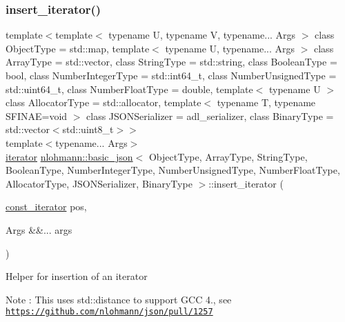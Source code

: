 \subsubsection{\texorpdfstring{insert\+\_\+iterator()}{insert\_iterator()}}
{\footnotesize\ttfamily template$<$template$<$ typename U, typename V, typename... Args $>$ class Object\+Type = std\+::map, template$<$ typename U, typename... Args $>$ class Array\+Type = std\+::vector, class String\+Type  = std\+::string, class Boolean\+Type  = bool, class Number\+Integer\+Type  = std\+::int64\+\_\+t, class Number\+Unsigned\+Type  = std\+::uint64\+\_\+t, class Number\+Float\+Type  = double, template$<$ typename U $>$ class Allocator\+Type = std\+::allocator, template$<$ typename T, typename S\+F\+I\+N\+A\+E=void $>$ class J\+S\+O\+N\+Serializer = adl\+\_\+serializer, class Binary\+Type  = std\+::vector$<$std\+::uint8\+\_\+t$>$$>$ \\
template$<$typename... Args$>$ \\
\hyperlink{classnlohmann_1_1basic__json_aa549b2b382916b3baafb526e5cb410bd}{iterator} \hyperlink{classnlohmann_1_1basic__json}{nlohmann\+::basic\+\_\+json}$<$ Object\+Type, Array\+Type, String\+Type, Boolean\+Type, Number\+Integer\+Type, Number\+Unsigned\+Type, Number\+Float\+Type, Allocator\+Type, J\+S\+O\+N\+Serializer, Binary\+Type $>$\+::insert\+\_\+iterator (\begin{DoxyParamCaption}\item[{\hyperlink{classnlohmann_1_1basic__json_aebd2cfa7e4ded4e97cde9269bfeeea38}{const\+\_\+iterator}}]{pos,  }\item[{Args \&\&...}]{args }\end{DoxyParamCaption})\hspace{0.3cm}{\ttfamily [inline]}}

Helper for insertion of an iterator \begin{DoxyNote}{Note}
\+: This uses std\+::distance to support G\+CC 4., see \href{https://github.com/nlohmann/json/pull/1257}{\tt https\+://github.\+com/nlohmann/json/pull/1257} 
\end{DoxyNote}
\mbox{\label{classnlohmann_1_1basic__json_ab5b70d60a636b9c5e10f6c8caac60b9e}} 
